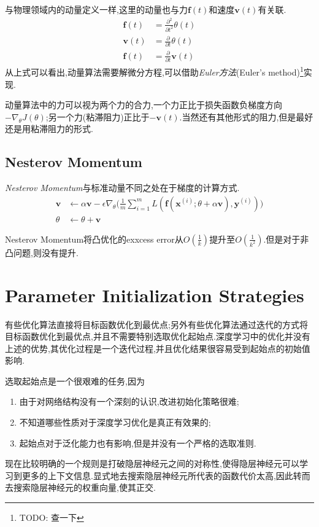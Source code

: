 与物理领域内的动量定义一样,这里的动量也与力$\mathbf f(t)$和速度$\mathbf v(t)$有关联.
\begin{equation}\begin{split}
\mathbf f(t)&=\frac{\partial^2}{\partial t^2}\theta(t)\\
\mathbf v(t)&=\frac{\partial}{\partial t}\theta(t)\\
\mathbf f(t)&=\frac{\partial}{\partial t}\mathbf v(t)
\end{split}\end{equation}
从上式可以看出,动量算法需要解微分方程,可以借助\textit{Euler方法}(Euler's method)\footnote{TODO: 查一下}实现.

动量算法中的力可以视为两个力的合力,一个力正比于损失函数负梯度方向$-\nabla_\theta J(\theta)$;另一个力(粘滞阻力)正比于$-\mathbf v(t)$.当然还有其他形式的阻力,但是最好还是用粘滞阻力的形式.

\subsection{Nesterov Momentum}

\textit{Nesterov Momentum}与标准动量不同之处在于梯度的计算方式.
\begin{equation}\begin{split}
\mathbf v&\leftarrow\alpha\mathbf v-\epsilon\nabla_\theta\Big(\frac{1}{m}\sum_{i=1}^mL(\mathbf f(\mathbf x^{(i)};\theta+\alpha\mathbf v),\mathbf y^{(i)})\Big)\\
\theta&\leftarrow\theta+\mathbf v
\end{split}\end{equation}

Nesterov Momentum将凸优化的exxcess error从$O(\frac{1}{k})$提升至$O(\frac{1}{k^2})$.但是对于非凸问题,则没有提升.

\section{Parameter Initialization Strategies}

有些优化算法直接将目标函数优化到最优点;另外有些优化算法通过迭代的方式将目标函数优化到最优点,并且不需要特别选取优化起始点.深度学习中的优化并没有上述的优势,其优化过程是一个迭代过程,并且优化结果很容易受到起始点的初始值影响.

选取起始点是一个很艰难的任务,因为
\begin{enumerate}
    \item 由于对网络结构没有一个深刻的认识,改进初始化策略很难;
    \item 不知道哪些性质对于深度学习优化是真正有效果的;
    \item 起始点对于泛化能力也有影响,但是并没有一个严格的选取准则.
\end{enumerate}
现在比较明确的一个规则是打破隐层神经元之间的对称性,使得隐层神经元可以学习到更多的上下文信息.显式地去搜索隐层神经元所代表的函数代价太高,因此转而去搜索隐层神经元的权重向量,使其正交.

